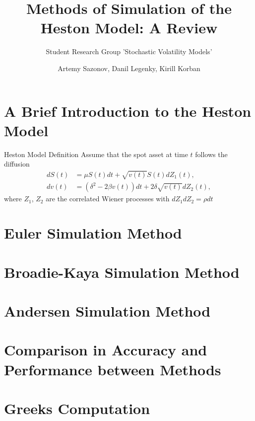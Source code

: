 \documentclass{vegapresentation}
\subtitle{Student Research Group 'Stochastic Volatility Models'}
\title{Methods of Simulation of the Heston Model: A Review}
\author{Artemy Sazonov, Danil Legenky, Kirill Korban}
\institute{Lomonosov Moscow State Univesity, Faculty of Mechanics and Mathematics}
\begin{document}
    \begin{frame}
        \maketitle
    \end{frame}

    \section{A Brief Introduction to the Heston Model}
        \begin{frame}{Heston Model Definition}
            Assume that the spot asset at time $t$ follows the diffusion
            \begin{align}
                dS(t) & = \mu S(t)dt + \sqrt{v(t)} S(t) dZ_1(t), \label{Heston:price}\\
                dv(t) & = \left(\delta^2 - 2\beta v(t)\right) dt + 2\delta \sqrt{v(t)} dZ_2(t), \label{Heston:variance}
            \end{align}
            where $Z_1$, $Z_2$ are the correlated Wiener processes with $dZ_1dZ_2 = \rho dt$
        \end{frame}

    \section{Euler Simulation Method}
        

    \section{Broadie-Kaya Simulation Method} 
        

    \section{Andersen Simulation Method}
        

    \section{Comparison in Accuracy and Performance between Methods}
        
    \section{Greeks Computation}
    
\end{document}
